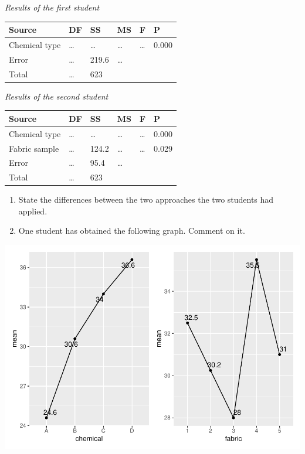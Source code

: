 \documentclass[
  a4paper]{article}
\begin{document}
\emph{Results of the first student}

\begin{longtable}[]{@{}llllll@{}}
\toprule\noalign{}
Source & DF & SS & MS & F & P \\
\midrule\noalign{}
\endhead
\bottomrule\noalign{}
\endlastfoot
Chemical type & \ldots{} & \ldots{} & \ldots{} & \ldots{} & 0.000 \\
Error & \ldots{} & 219.6 & \ldots{} & & \\
Total & \ldots{} & 623 & & & \\
\end{longtable}

\emph{Results of the second student}

\begin{longtable}[]{@{}llllll@{}}
\toprule\noalign{}
Source & DF & SS & MS & F & P \\
\midrule\noalign{}
\endhead
\bottomrule\noalign{}
\endlastfoot
Chemical type & \ldots{} & \ldots{} & \ldots{} & \ldots{} & 0.000 \\
Fabric sample & \ldots{} & 124.2 & \ldots{} & \ldots{} & 0.029 \\
Error & \ldots{} & 95.4 & \ldots{} & & \\
Total & \ldots{} & 623 & & & \\
\end{longtable}

\begin{enumerate}
\def\labelenumi{\roman{enumi})}
\setcounter{enumi}{1}
\item
  State the differences between the two approaches the two students had
  applied.
\item
  One student has obtained the following graph. Comment on it.
\end{enumerate}

\includegraphics{index_files/figure-latex/unnamed-chunk-4-1.pdf}
\end{document}
